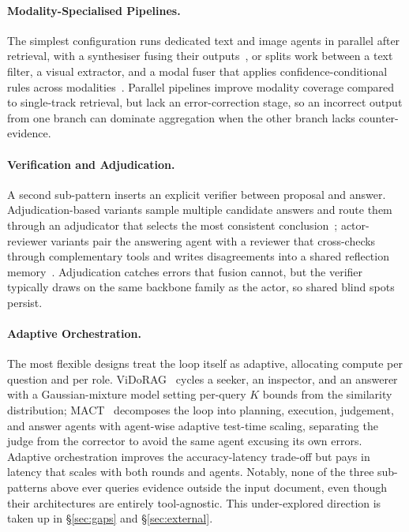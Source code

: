 \documentclass[11pt]{article}
\begin{document}
\paragraph{Modality-Specialised Pipelines.}
The simplest configuration runs dedicated text and image agents in parallel after retrieval, with a synthesiser fusing their outputs~\cite{han2025mdocagent}, or splits work between a text filter, a visual extractor, and a modal fuser that applies confidence-conditional rules across modalities~\cite{duan2025m2rag}. Parallel pipelines improve modality coverage compared to single-track retrieval, but lack an error-correction stage, so an incorrect output from one branch can dominate aggregation when the other branch lacks counter-evidence.

\paragraph{Verification and Adjudication.}
A second sub-pattern inserts an explicit verifier between proposal and answer. Adjudication-based variants sample multiple candidate answers and route them through an adjudicator that selects the most consistent conclusion~\cite{zhu2025doclens}; actor-reviewer variants pair the answering agent with a reviewer that cross-checks through complementary tools and writes disagreements into a shared reflection memory~\cite{sun2025docagent}. Adjudication catches errors that fusion cannot, but the verifier typically draws on the same backbone family as the actor, so shared blind spots persist.

\paragraph{Adaptive Orchestration.}
The most flexible designs treat the loop itself as adaptive, allocating compute per question and per role. ViDoRAG~\cite{wang2025vidorag} cycles a seeker, an inspector, and an answerer with a Gaussian-mixture model setting per-query $K$ bounds from the similarity distribution; MACT~\cite{yu2025mact} decomposes the loop into planning, execution, judgement, and answer agents with agent-wise adaptive test-time scaling, separating the judge from the corrector to avoid the same agent excusing its own errors. Adaptive orchestration improves the accuracy-latency trade-off but pays in latency that scales with both rounds and agents. Notably, none of the three sub-patterns above ever queries evidence outside the input document, even though their architectures are entirely tool-agnostic. This under-explored direction is taken up in \S\ref{sec:gaps} and \S\ref{sec:external}.
\end{document}
